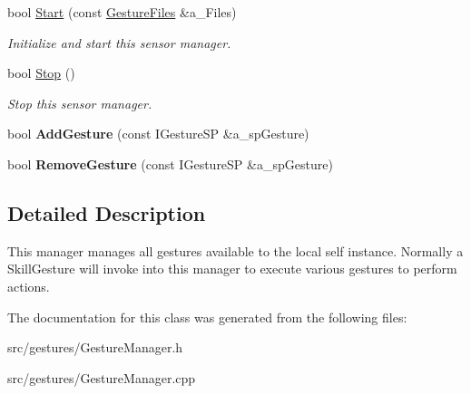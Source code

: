 \begin{DoxyCompactItemize}
\mbox{\label{class_gesture_manager_ab227e6b7b7e111594725fcd3e571e929}} 
bool \hyperlink{class_gesture_manager_ab227e6b7b7e111594725fcd3e571e929}{Start} (const \hyperlink{class_gesture_manager_a72da7b5c9399cc34be1ec0337c447f54}{Gesture\+Files} \&a\+\_\+\+Files)
\begin{DoxyCompactList}\small\item\em Initialize and start this sensor manager. \end{DoxyCompactList}\item 
\mbox{\label{class_gesture_manager_a22472656b5488240160d5a9bde47aa6a}} 
bool \hyperlink{class_gesture_manager_a22472656b5488240160d5a9bde47aa6a}{Stop} ()
\begin{DoxyCompactList}\small\item\em Stop this sensor manager. \end{DoxyCompactList}\item 
\mbox{\label{class_gesture_manager_a861ab88404e3de59931aea922c6b5f87}} 
bool {\bfseries Add\+Gesture} (const I\+Gesture\+SP \&a\+\_\+sp\+Gesture)
\item 
\mbox{\label{class_gesture_manager_afd960ebe3b54c2d61ea40676743b2f84}} 
bool {\bfseries Remove\+Gesture} (const I\+Gesture\+SP \&a\+\_\+sp\+Gesture)
\end{DoxyCompactItemize}


\subsection{Detailed Description}
This manager manages all gestures available to the local self instance. Normally a Skill\+Gesture will invoke into this manager to execute various gestures to perform actions. 

The documentation for this class was generated from the following files\+:\begin{DoxyCompactItemize}
\item 
src/gestures/Gesture\+Manager.\+h\item 
src/gestures/Gesture\+Manager.\+cpp\end{DoxyCompactItemize}
